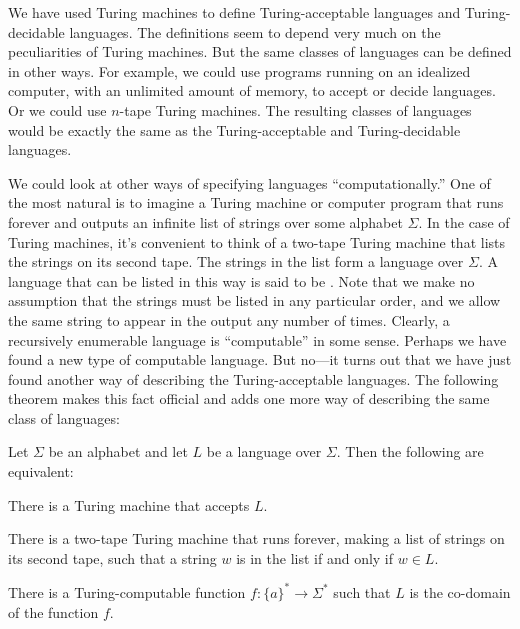 \medbreak

We have used Turing machines to define Turing-acceptable languages
and Turing-decidable languages.  The definitions seem to depend
very much on the peculiarities of Turing machines.  But the same
classes of languages can be defined in other ways.  For example,
we could use programs running on an idealized computer, with an
unlimited amount of memory, to accept or decide languages.  Or we
could use $n$-tape Turing machines.  The
resulting classes of languages would be exactly the same as the
Turing-acceptable and Turing-decidable languages.

We could look at other ways of specifying languages ``computationally.''
One of the most natural is to imagine a Turing machine or computer
program that runs forever and outputs an infinite list of strings
over some alphabet $\Sigma$.  In the case of Turing machines, it's
convenient to think of a two-tape Turing machine that lists the strings
on its second tape.  The strings in the list form a language
over $\Sigma$.  A language that can be listed in this way is
said to be . 
Note that we make no
assumption that the strings must be listed in any particular order,
and we allow the same string to appear in the output any number of
times.  Clearly, a recursively enumerable language is ``computable''
in some sense.  Perhaps we have found a new type of computable language.
But no---it turns out that we have just found another way of
describing the Turing-acceptable languages.  The following theorem
makes this fact official and adds one more way of describing
the same class of languages:

\begin{theorem}
Let $\Sigma$ be an alphabet and let $L$ be a language over $\Sigma$.
Then the following are equivalent:

\smallskip
{}There is a Turing machine that accepts $L$.

\smallskip
{}There is a two-tape Turing machine that runs forever, making 
a list of strings on its second tape, such that a string $w$ is in 
the list if and only if $w\in L$.

\smallskip
{}There is a Turing-computable function $f\colon\{a\}^*\to\Sigma^*$
such that $L$ is the co-domain of the function $f$.
\end{theorem}

